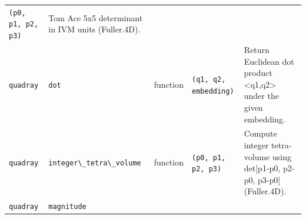 \documentclass[
  10pt,
]{article}
\newcommand{\passthrough}[1]{#1}
\begin{document}
\begin{longtable}[]{@{}lllll@{}}
\begin{minipage}[t]{0.17\columnwidth}
\passthrough{\lstinline!(p0, p1, p2, p3)!}\strut
\end{minipage} & \begin{minipage}[t]{0.17\columnwidth}\raggedright
Tom Ace 5x5 determinant in IVM units (Fuller.4D).\strut
\end{minipage}\tabularnewline
\begin{minipage}[t]{0.17\columnwidth}\raggedright
\passthrough{\lstinline!quadray!}\strut
\end{minipage} & \begin{minipage}[t]{0.17\columnwidth}\raggedright
\passthrough{\lstinline!dot!}\strut
\end{minipage} & \begin{minipage}[t]{0.17\columnwidth}\raggedright
function\strut
\end{minipage} & \begin{minipage}[t]{0.17\columnwidth}\raggedright
\passthrough{\lstinline!(q1, q2, embedding)!}\strut
\end{minipage} & \begin{minipage}[t]{0.17\columnwidth}\raggedright
Return Euclidean dot product \textless q1,q2\textgreater{} under the
given embedding.\strut
\end{minipage}\tabularnewline
\begin{minipage}[t]{0.17\columnwidth}\raggedright
\passthrough{\lstinline!quadray!}\strut
\end{minipage} & \begin{minipage}[t]{0.17\columnwidth}\raggedright
\passthrough{\lstinline!integer\_tetra\_volume!}\strut
\end{minipage} & \begin{minipage}[t]{0.17\columnwidth}\raggedright
function\strut
\end{minipage} & \begin{minipage}[t]{0.17\columnwidth}\raggedright
\passthrough{\lstinline!(p0, p1, p2, p3)!}\strut
\end{minipage} & \begin{minipage}[t]{0.17\columnwidth}\raggedright
Compute integer tetra-volume using det{[}p1-p0, p2-p0, p3-p0{]}
(Fuller.4D).\strut
\end{minipage}\tabularnewline
\begin{minipage}[t]{0.17\columnwidth}\raggedright
\passthrough{\lstinline!quadray!}\strut
\end{minipage} & \begin{minipage}[t]{0.17\columnwidth}\raggedright
\passthrough{\lstinline!magnitude!}\strut

\end{minipage}
\end{longtable}
\end{document}
